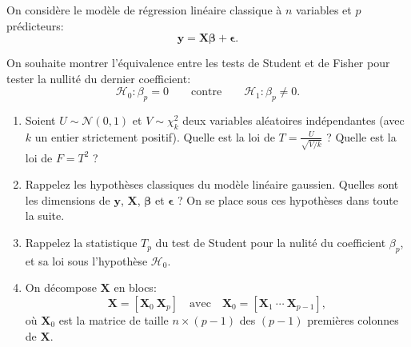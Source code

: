 \documentclass{../headers/td_upc}
\providecommand{\1}{\mathds{1}}
\begin{document}
On considère le modèle de régression linéaire classique à $n$ variables et $p$ prédicteurs:
$$
\mathbf{y} = \mathbf{X} \boldsymbol{\beta} + \boldsymbol{\epsilon}.
$$

On souhaite montrer l'équivalence entre les tests de Student et de Fisher pour
tester la nullité du dernier coefficient:
$$
\mathcal{H}_{0}: \beta_{p}=0 \qquad \text{contre} \qquad \mathcal{H}_{1}: \beta_{p} \neq 0.
$$

\begin{enumerate}
  \item Soient $U \sim \mathcal{N}(0, 1)$ et $V \sim \chi^2_k$
  deux variables aléatoires indépendantes (avec $k$ un entier strictement positif).
  Quelle est la loi de $T = \frac{U}{\sqrt{V/k}}$ ?
  Quelle est la loi de $F = T^{2}$ ?
  
  
  \item Rappelez les hypothèses classiques du modèle linéaire gaussien.
  Quelles sont les dimensions de $\mathbf{y}$, $\mathbf{X}$, $\boldsymbol{\beta}$ et $\boldsymbol{\epsilon}$ ?
  On se place sous ces hypothèses dans toute la suite.
  
  
  \item Rappelez la statistique $T_p$ du test de Student pour la nulité du coefficient $\beta_p$,
  et sa loi sous l'hypothèse $\mathcal{H}_{0}$.
  
  
  \item On décompose $\mathbf{X}$ en blocs:
  $$
  \mathbf{X} = \left[\mathbf{X}_{0} \  \mathbf{X}_{p}\right]
  \quad \text{avec} \quad
  \mathbf{X}_{0} = \left[\mathbf{X}_{1}\ \cdots\ \mathbf{X}_{p-1}\right],
  $$
  où $\mathbf{X}_{0}$ est la matrice de taille $n \times(p-1)$
  des $(p-1)$ premières colonnes de $\mathbf{X}$.
  

\end{enumerate}
\end{document}
